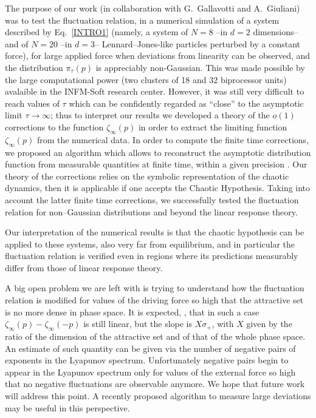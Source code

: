 \documentclass[pre,aps]{revtex4}
\let\z=\zeta  \let\h=\eta   \let\th=\theta \let\k=\kappa \let\l=\lambda
\let\s=\sigma \let\t=\tau   \let\f=\varphi \let\c=\chi
\let\io=\infty
\begin{document}
The purpose of our work (in collaboration with G.~Gallavotti and
A.~Giuliani) was to test the fluctuation relation, 
in a numerical simulation
of a system described by Eq.~\ref{INTRO1}
(namely, a system of $N=8$ --in $d=2$ dimensions--
and of $N=20$ --in $d=3$-- Lennard--Jones-like particles perturbed
by a constant force), for large 
applied force when deviations from linearity can be observed, and
the distribution $\pi_\tau(p)$ is appreciably non-Gaussian.
This was made possible by the large computational power 
(two clusters of 18 and 32 biprocessor units)
avalaible in the INFM-Soft research center. However,
it was still very difficult to reach values of $\tau$ which
can be confidently regarded as ``close'' to the asymptotic limit 
$\tau \rightarrow \infty$;
thus to interpret our results we developed a theory of the $o(1)$ 
corrections to the function
$\zeta_\infty(p)$ in order to extract the limiting function 
$\zeta_\infty(p)$ from the
numerical data. 
In order to compute the finite time corrections, 
we proposed an algorithm which allows to reconstruct the asymptotic 
distribution function from measurable quantities at finite time, within
a given precision \cite{GGZ05}. Our theory of the corrections relies on the 
symbolic representation of the chaotic dynamics, then it is 
applicable if one accepts the Chaotic Hypothesis.
Taking into account the latter finite time corrections, 
we successfully tested the fluctuation relation for 
non--Gaussian distributions and beyond the
linear response theory.

Our interpretation of the numerical results is that the 
chaotic hypothesis can be applied to these
systems, also very far from equilibrium, and in particular
the fluctuation relation is 
verified even in regions where its predictions measurably differ 
from those of linear response theory.

A big open problem we are left with is trying to understand 
how the fluctuation relation is modified for values
of the driving force so high that the attractive set is no more dense in phase
space. It is expected, \cite{BG97,Ga99b},
that in such a case 
$\z_\io(p)-\z_\io(-p)$ is still linear, but the slope is $X\s_+$, with 
$X$ given by the ratio of the dimension of the attractive set and
of that of the whole phase space. An estimate of such quantity can be given 
via the number of negative pairs of exponents in the Lyapunov spectrum.
Unfortunately negative pairs begin to appear in the Lyapunov spectrum
only for values of the external force so high that no negative fluctuations
are observable anymore.
We hope that future work will address this point. A recently proposed
algorithm to measure large deviations \cite{GKP05} may be useful
in this perspective.
\end{document}
